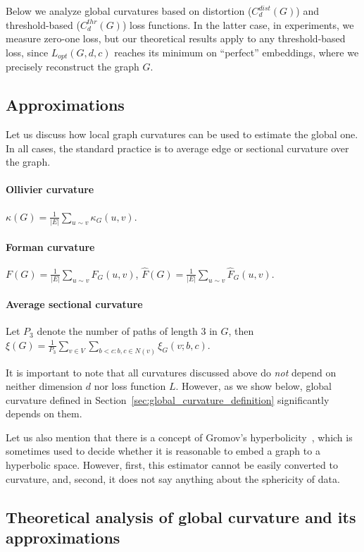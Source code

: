 \documentclass{article} %
\begin{document}
Below we analyze global curvatures based on distortion ($C_d^{dist}(G)$) and threshold-based ($C_d^{thr}(G)$) loss functions. 
In the latter case, in experiments, we measure zero-one loss, but our theoretical results apply to any threshold-based loss, since 
$L_{opt}(G,d,c)$ reaches its minimum on ``perfect'' embeddings, where we precisely reconstruct the graph $G$.

\subsection{Approximations}

Let us discuss how local graph curvatures can be used to estimate the global one. In all cases, the standard practice is to average edge or sectional curvature over the graph.

\paragraph{Ollivier curvature} $\kappa(G) = \frac{1}{|E|}\sum\limits_{u\sim v} \kappa_G(u,v)$.

\paragraph{Forman curvature} $F(G) = \frac{1}{|E|}\sum\limits_{u\sim v} F_G(u,v)$, $\hat F(G) = \frac{1}{|E|}\sum\limits_{u\sim v} \hat F_G(u,v)$.

\paragraph{Average sectional curvature} Let $P_3$ denote the number of paths of length 3 in $G$, then $\xi(G) = \frac{1}{P_3} \sum\limits_{v \in V }\sum\limits_{b<c: b,c\in N(v)} \xi_G(v;b,c)$.

It is important to note that all curvatures discussed above do \textit{not} depend on neither dimension $d$ nor loss function $L$. However, as we show below, global curvature defined in Section~\ref{sec:global_curvature_definition} significantly depends on them.

Let us also mention that there is a concept of Gromov's hyperbolicity~\citep{gromov1987hyperbolic}, which is sometimes used to decide whether it is reasonable to embed a graph to a hyperbolic space. However, first, this estimator cannot be easily converted to curvature, and, second, it does not say anything about the sphericity of data.

\subsection{Theoretical analysis of global curvature and its approximations}\label{sec:theory}
\end{document}
